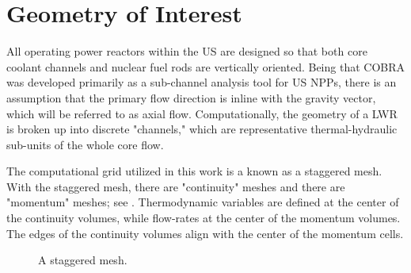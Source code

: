 \section{Geometry of Interest}
\label{sect:topology}
All operating power reactors within the US are designed so that both core coolant channels and nuclear fuel rods are vertically oriented.
Being that COBRA was developed primarily as a sub-channel analysis tool for US NPPs, there is an assumption that the primary flow direction is inline with the gravity vector, which will be referred to as axial flow.
Computationally, the geometry of a LWR is broken up into discrete "channels," which are representative thermal-hydraulic sub-units of the whole core flow.

The computational grid utilized in this work is a known as a staggered mesh.
With the staggered mesh, there are "continuity" meshes and there are "momentum" meshes; see .
Thermodynamic variables are defined at the center of the continuity volumes, while flow-rates at the center of the momentum volumes.
The edges of the continuity volumes align with the center of the momentum cells.

\begin{figure}[ht]
\caption{A staggered mesh.}
\label{fig:staggered_mesh}
\begin{center}
\end{center}
\end{figure}

